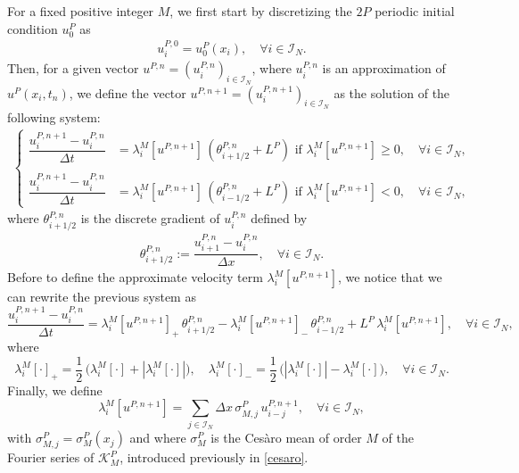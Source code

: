\documentclass[11pt]{amsart}
\newcommand{\K}{\mathcal{K}}
\newcommand{\I}{\mathcal{I}_N}
\begin{document}
For a fixed positive integer $M$,  we first start by discretizing
the $2P$ periodic initial condition $u^P_0$ as
\begin{align}\label{schemeIC}
u_i^{P, 0} =  u^P_0(x_i), \quad \forall i \in \I.
\end{align}
Then, for a given vector $u^{P,n} = (u^{P, n} _i)_{i \in \I}$, where $u^{P,n}_i$ is an approximation of $u^P(x_i,t_n)$,  we define the vector $u^{P,n+1}= (u^{P, n+1} _i)_{i \in \I}$ as the solution of the following system: 
\begin{align*}
\begin{cases}
  \dfrac{u_i^{ P, n+1} - u_i^{P, n}}{\Delta t} &=   \lambda^M_i \left[u^{P, n + 1}\right] \, \left(\theta^{P,n}_{i+1/2} + L^P \right)  \mbox{ if }   \lambda^M_i \left[u^{P, n + 1}\right] \geq 0, \quad \forall i \in \I,\\ \\
  \dfrac{u_i^{P, n+1} - u_i^{P, n}}{\Delta t} &=  \lambda^M_i \left[u^{P, n + 1}\right] \, \left(\theta^{P,n}_{i-1/2}+ L^P \right)  \mbox{ if }   \lambda^M_i \left[u^{P, n + 1}\right] < 0, \quad \forall i \in \I, 
\end{cases}
\end{align*}
where $ \theta^{P,n}_{i+1/2}$ is the discrete gradient of $u^{P, n} _i$  defined by 
\begin{align}\label{def.dis.grad}
    \theta^{P,n}_{i+1/2} := \dfrac{u^{P,n}_{i+1}-u^{P,n}_i}{\Delta x}, \quad \forall i\in\I.
\end{align}
Before to define the approximate velocity term $\lambda^M_i\left[u^{P,n+1}\right]$, we notice that we can rewrite the previous system as
\begin{equation}\label{numerical compacted scheme}
    \frac{u_i^{P, n+1} - u_i^{P, n}}{\Delta t} =  \lambda^M_i\left[u^{P, n + 1}\right]_+ \, \theta^{P,n}_{i+1/2} - \lambda^M_i\left[u^{P, n + 1}\right]_- \, \theta^{P,n}_{i-1/2}  + L^P \, \lambda^M_i\left[u^{P, n + 1}\right], \quad \forall i \in \I,
\end{equation}
where
\[
\lambda^M_i [\cdot]_+ = \frac{1}{2} \,\Big(\lambda^M_i [\cdot] + \left|\lambda^M_i [\cdot]\right|\Big), \quad \lambda^M_i [\cdot]_- = \frac{1}{2} \,\Big(\left|\lambda^M_i [\cdot]\right| - \lambda^M_i [\cdot] \Big), \quad \forall i \in \I.
\]
Finally, we define
  \begin{equation}\label{h(x)}
  \lambda^M_i \left[u^{P, n + 1}\right]= \sum_{j \in \I} \Delta x \, \sigma_{M,j}^P \, u^{P, n + 1}_{i - j}, \quad \forall i \in \I, 
 \end{equation}
 with $\sigma_{M,j}^P=\sigma_{M}^P(x_j)$ and where $\sigma_{M}^P$ is the Ces\`aro mean of order $M$ 
 of the Fourier series of $\K^P_M$, introduced previously in \eqref{cesaro}. 
 
\end{document}
